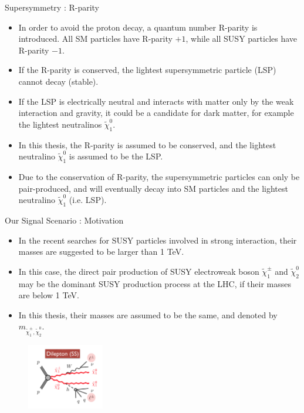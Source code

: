 \documentclass[mathserif,serif]{beamer}
\begin{document}
\begin{frame}{Supersymmetry : R-parity}
\begin{itemize}
\item In order to avoid the proton decay, a quantum number R-parity is introduced. All SM particles have R-parity $+1$, while all SUSY particles have R-parity $-1$.
\item If the R-parity is conserved, the lightest supersymmetric particle (LSP) cannot decay (stable).
\item If the LSP is electrically neutral and interacts with matter only by the weak interaction and gravity, it could be a candidate for dark matter, for example the lightest neutralinos $\tilde{\chi}_1^0$.
\item In this thesis, the R-parity is assumed to be conserved, and the lightest neutralino $\tilde{\chi}_1^0$ is assumed to be the LSP.
\item Due to the conservation of R-parity, the supersymmetric particles can only be pair-produced, and will eventually decay into SM particles and the lightest neutralino $\tilde{\chi}_1^0$ (i.e. LSP).
\end{itemize}
\end{frame}

\begin{frame}{Our Signal Scenario : Motivation}
\begin{itemize}
\item In the recent searches for SUSY particles involved in strong interaction, their masses are suggested to be larger than 1 TeV.
\item In this case, the direct pair production of SUSY electroweak boson $\tilde{\chi}_1^\pm$  and $\tilde{\chi}_2^0$ may be the dominant SUSY production process at the LHC, if their masses are below 1 TeV.
\item In this thesis, their masses are assumed to be the same, and denoted by $m_{\tilde{\chi}_1^\pm , \tilde{\chi}_2^0}$.
\end{itemize}
\begin{figure}
\centering
\includegraphics[width=0.3\textwidth]{data/photo/theory/signal_feynman.png}
\end{figure}
\end{frame}
\end{document}
